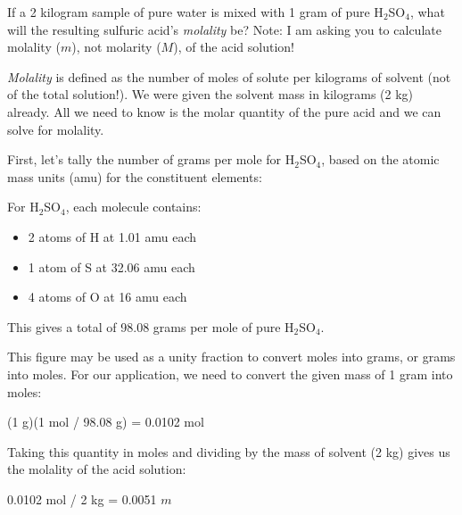 

If a 2 kilogram sample of pure water is mixed with 1 gram of pure H$_{2}$SO$_{4}$, what will the resulting sulfuric acid's {\it molality} be?  Note: I am asking you to calculate molality ($m$), not molarity ($M$), of the acid solution!







{\it Molality} is defined as the number of moles of solute per kilograms of solvent (not of the total solution!).  We were given the solvent mass in kilograms (2 kg) already.  All we need to know is the molar quantity of the pure acid and we can solve for molality.

First, let's tally the number of grams per mole for H$_{2}$SO$_{4}$, based on the atomic mass units (amu) for the constituent elements:

\vskip 10pt

\noindent
For H$_{2}$SO$_{4}$, each molecule contains:

\begin{itemize}
\item{} 2 atoms of H at 1.01 amu each
\item{} 1 atom of S at 32.06 amu each
\item{} 4 atoms of O at 16 amu each
\end{itemize}

This gives a total of 98.08 grams per mole of pure H$_{2}$SO$_{4}$.

\vskip 10pt

This figure may be used as a unity fraction to convert moles into grams, or grams into moles.  For our application, we need to convert the given mass of 1 gram into moles:

\vskip 10pt

(1 g)(1 mol / 98.08 g) = 0.0102 mol

\vskip 10pt

Taking this quantity in moles and dividing by the mass of solvent (2 kg) gives us the molality of the acid solution:

\vskip 10pt

0.0102 mol / 2 kg = 0.0051 $m$












